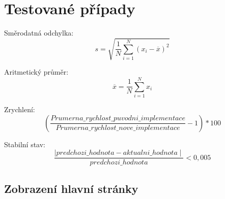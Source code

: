 


    \section{Testované případy}


    

        Směrodatná odchylka:
        \begin{equation}\label{eqOdchylka}
            s = \sqrt{\frac{1}{N} \sum_{i=1}^N (x_i - \overline{x})^2}      
        \end{equation}

        Aritmetický průměr:
        \begin{equation}\label{eqOdchylka}
            \overline{x} = \frac{1}{N}\sum_{i=1}^Nx_i
        \end{equation}


        Zrychlení:
        \begin{equation}\label{eqZrychleni}
            \left(\frac{Prumerna\_rychlost\_puvodni\_implementace}{Prumerna\_rychlost\_nove\_implementace} - 1\right)* 100
        \end{equation}

        Stabilní stav:
        \begin{equation}\label{eqStabilni}
            \frac{\mid predchozi\_hodnota - aktualni\_hodnota\mid}{predchozi\_hodnota} < 0,005
        \end{equation}


        \subsection{Zobrazení hlavní stránky}

